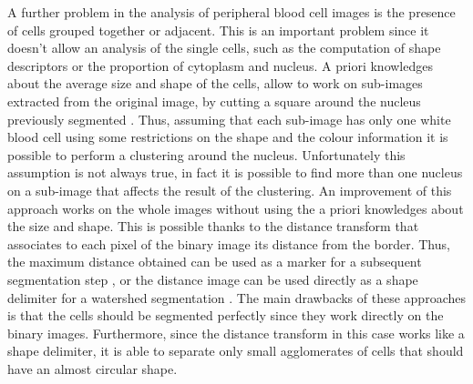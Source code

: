 \documentclass[final,a4paper,12pt,english]{UnicaPhdThesis3}
\begin{document}
	A further problem in the analysis of peripheral blood cell images is the presence of cells grouped together or adjacent. This is an important problem since it doesn't allow an analysis of the single cells, such as the computation of shape descriptors or the proportion of cytoplasm and nucleus. A priori knowledges about the average size and shape of the cells, allow to work on sub-images extracted from the original image, by cutting a square around the nucleus previously segmented \cite{Kovalev, Sinha}. Thus, assuming that each sub-image has only one white blood cell using some restrictions on the shape and the colour information it is possible to perform a clustering around the nucleus. Unfortunately this assumption is not always true, in fact it is possible to find more than one nucleus on a sub-image that affects the result of the clustering. An improvement of this approach works on the whole images without using the a priori knowledges about the size and shape. This is possible thanks to the distance transform \cite{Maurer} that associates to each pixel of the binary image its distance from the border. Thus, the maximum distance obtained can be used as a marker for a subsequent segmentation step \cite{Malpica}, or the distance image can be used directly as a shape delimiter for a watershed segmentation \cite{Lindblad}. The main drawbacks of these approaches is that the cells should be segmented perfectly since they work directly on the binary images. Furthermore, since the distance transform in this case works like a shape delimiter, it is able to separate only small agglomerates of cells that should have an almost circular shape.
	
\end{document}
